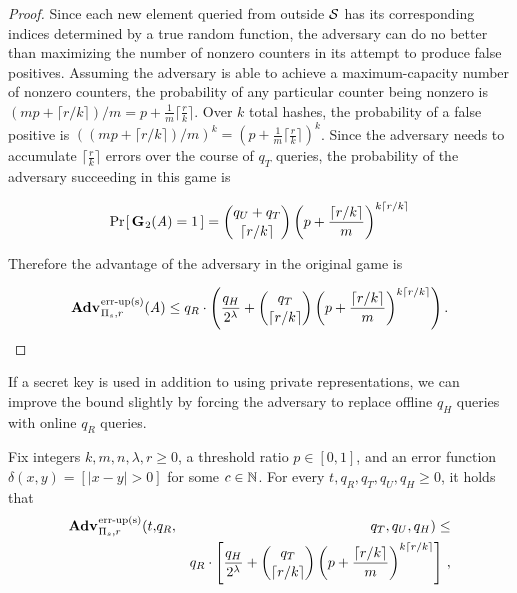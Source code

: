 \begin{proof}
Since each new element queried from outside $\mathcal{S}$ has its corresponding indices
determined by a true random function, the adversary can do no better than
maximizing the number of nonzero counters in its attempt to produce false
positives. Assuming the adversary is able to achieve a maximum-capacity number
of nonzero counters, the probability of any particular counter being nonzero is
$(mp + \lceil r/k \rceil)/m = p + \frac{1}{m}\lceil\frac{r}{k}\rceil$. Over $k$
total hashes, the probability of a false positive is $\left((mp + \lceil r/k
\rceil)/m\right)^k = \left(p + \frac{1}{m}\lceil\frac{r}{k}\rceil\right)^k$.
Since the adversary needs to accumulate $\lceil\frac{r}{k}\rceil$ errors over
the course of $q_T$ queries, the probability of the adversary succeeding in this
game is

$$\Pr\hspace{-1pt}\left[\,\textup{\textbf{G}}\hspace{0.5pt}_2(\mathit{A}) = 1\,\right] = \binom{q_U + q_T}{\lceil r/k \rceil}\left(p+\frac{\lceil r/k \rceil}{m}\right)^{k\lceil r/k \rceil}$$

Therefore the advantage of the adversary in the original game is

$$\Adv{\erreps}_{\struct_s,r}(\advA) \le q_R \cdot \left(\frac{q_H}{2^\lambda} + \binom{q_T}{\lceil r/k \rceil}\left(p+\frac{\lceil r/k \rceil}{m}\right)^{k\lceil r/k \rceil}\right).$$

\end{proof}

If a secret key is used in addition to using private representations, we can improve the bound slightly by forcing the adversary to replace offline $q_H$ queries with online $q_R$ queries.

\begin{theorem}\label{thm:count-ms-bound}
Fix integers $k, m, n, \lambda, r\geq 0$, a threshold ratio $p \in [0,1]$, and
an error function $\delta(x,y) = [|x - y| > 0]$ for some $c \in \mathbb{N}$.
  For every $t, q_R, q_T, q_U, q_H \geq 0$, it holds that
  \begin{eqnarray*}
    \Adv{\erreps}_{\struct_s,r}(t,&q_R,& q_T, q_U, q_H) \leq \\ && q_R \cdot \left[\frac{q_H}{2^\lambda} + \binom{q_T}{\lceil r/k \rceil}\left(p+\frac{\lceil r/k \rceil}{m}\right)^{k\lceil r/k \rceil}\right] \,,
\end{eqnarray*}
\end{theorem}

